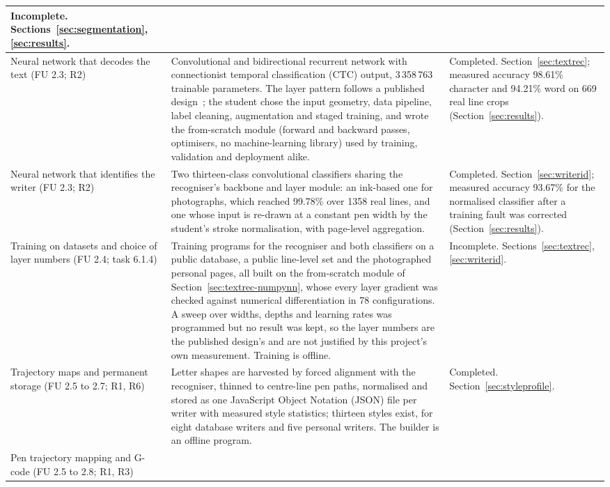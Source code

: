 \begin{table}[!htbp]
\begin{tabular}{|p{3.1cm}|p{7.4cm}|p{3.7cm}|}
Incomplete. Sections~\ref{sec:segmentation}, \ref{sec:results}. \\
\hline
Neural network that decodes the text (FU 2.3; R2) &
Convolutional and bidirectional recurrent network with connectionist temporal classification (CTC) output, 3\,358\,763 trainable parameters. The layer pattern follows a published design~\cite[p.~9]{kizilirmak2023}; the student chose the input geometry, data pipeline, label cleaning, augmentation and staged training, and wrote the from-scratch module (forward and backward passes, optimisers, no machine-learning library) used by training, validation and deployment alike. &
Completed. Section~\ref{sec:textrec}; measured accuracy 98.61\% character and 94.21\% word on 669 real line crops (Section~\ref{sec:results}). \\
\hline
Neural network that identifies the writer (FU 2.3; R2) &
Two thirteen-class convolutional classifiers sharing the recogniser's backbone and layer module: an ink-based one for photographs, which reached 99.78\% over 1358 real lines, and one whose input is re-drawn at a constant pen width by the student's stroke normalisation, with page-level aggregation. &
Completed. Section~\ref{sec:writerid}; measured accuracy 93.67\% for the normalised classifier after a training fault was corrected (Section~\ref{sec:results}). \\
\hline
Training on datasets and choice of layer numbers (FU 2.4; task 6.1.4) &
Training programs for the recogniser and both classifiers on a public database, a public line-level set and the photographed personal pages, all built on the from-scratch module of Section~\ref{sec:textrec-numpynn}, whose every layer gradient was checked against numerical differentiation in 78 configurations. A sweep over widths, depths and learning rates was programmed but no result was kept, so the layer numbers are the published design's and are not justified by this project's own measurement. Training is offline. &
Incomplete. Sections~\ref{sec:textrec}, \ref{sec:writerid}. \\
\hline
Trajectory maps and permanent storage (FU 2.5 to 2.7; R1, R6) &
Letter shapes are harvested by forced alignment with the recogniser, thinned to centre-line pen paths, normalised and stored as one JavaScript Object Notation (JSON) file per writer with measured style statistics; thirteen styles exist, for eight database writers and five personal writers. The builder is an offline program. &
Completed. Section~\ref{sec:styleprofile}. \\
\hline
Pen trajectory mapping and G-code (FU 2.5 to 2.8; R1, R3) &

\end{tabular}
\end{table}

